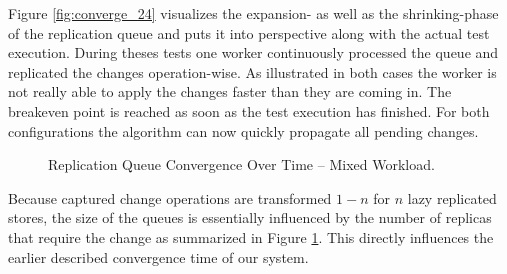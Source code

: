 

Figure \ref{fig:converge_24} visualizes the expansion- as well as the shrinking-phase of the replication queue
and puts it into perspective along with the actual test execution. During theses tests one worker continuously processed the queue and replicated 
the changes operation-wise. As illustrated in both cases the worker is not really able to apply the changes faster than they are coming in.
The breakeven point is reached as soon as the test execution has finished. For both configurations the algorithm can now quickly propagate all pending
changes.\\

\begin{figure}[t] 
    \centering 
    \caption{Replication Queue Convergence Over Time -- Mixed Workload.}
    \label{fig:converge24}
\end{figure}


Because captured change operations are transformed $1-n$ for $n$ lazy replicated stores, the size of the queues is essentially influenced by the number of replicas that
require the change as summarized in Figure \ref{fig:converge24}. This directly influences the earlier described convergence time of our system.







